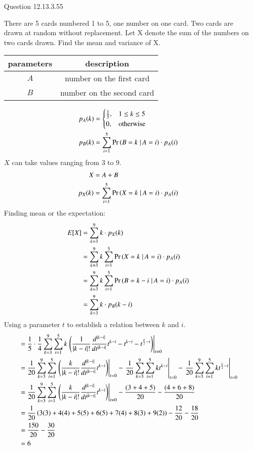 \documentclass[journal,12pt,onecolumn]{IEEEtran}
\theoremstyle{remark}
\begin{document}
Question 12.13.3.55

There are 5 cards numbered 1 to 5, one number on one card. Two cards are drawn at random without replacement. Let X denote the sum of the numbers on two cards drawn. Find the mean and variance of X.

\solution
\begin{table}[!ht]
\begin{tabular}{|c|c|}
	\hline
	\textbf{parameters} & \textbf{description}\\
	\hline
	$A$ & number on the first card \\
	\hline
	$B$ & number on the second card \\
	\hline
\end{tabular}
\end{table}
\begin{align}
p_A(k) &= 
	\begin{cases}
		\frac{1}{5}, & 1 \leq k \leq 5 \\
		0, & \text{otherwise}
	\end{cases}\\
p_B(k) &= \sum_{i=1}^5\Pr\left(B=k\left.\right |A=i\right)\cdot p_A(i)
\end{align}
$X$ can take values ranging from 3 to 9.
\begin{align}
	X &= A+B\\
	p_X(k) &= \sum_{i=1}^5\Pr\left(X=k\left. \right |A=i\right)\cdot p_A(i)
\end{align}
Finding mean or the expectation:
\begin{align}
	E[X] &= \sum_{k=3}^9k\cdot p_X(k)\\
	&= \sum_{k=3}^9k\sum_{i=1}^5\Pr\left(X=k\left. \right |A=i\right)\cdot p_A(i)\\
	&= \sum_{k=3}^9k\sum_{i=1}^5\Pr\left(B=k-i\left.\right |A=i\right)\cdot p_A(i)\\
	&= \sum_{k=3}^9k\cdot p_B(k-i)
\end{align}
Using a parameter $t$ to establish a relation between $k$ and $i$.
\begin{align}
	&= \frac{1}{5}\cdot\frac{1}{4}\sum_{k=3}^9\sum_{i=1}^5k\left.\left(\frac{1}{|k-i|!}\frac{d^{|k-i|}}{dt^{|k-i|}}t^{k-i}-t^{k-i}-t^{\frac{k}{2}-i}\right)\right |_{t=0}\\
	&= \frac{1}{20}\sum_{k=3}^9\sum_{i=1}^5\left.\left(\frac{k}{|k-i|!}\frac{d^{|k-i|}}{dt^{|k-i|}}t^{k-i}\right) \right |_{t=0} - \left.\frac{1}{20}\sum_{k=3}^9\sum_{i=1}^5kt^{k-i}\right |_{t=0} - \left.\frac{1}{20}\sum_{k=3}^9\sum_{i=1}^5kt^{\frac{k}{2}-i}\right |_{t=0}\\ \label{eq:12.13.3.55}
	&= \frac{1}{20}\sum_{k=3}^9\sum_{i=1}^5\left.\left(\frac{k}{|k-i|!}\frac{d^{|k-i|}}{dt^{|k-i|}}t^{k-i}\right) \right |_{t=0} - \frac{(3+4+5)}{20} - \frac{(4+6+8)}{20}\\
	&= \frac{1}{20}\left(3(3)+4(4)+5(5)+6(5)+7(4)+8(3)+9(2)\right) - \frac{12}{20} - \frac{18}{20}\\
	&= \frac{150}{20} - \frac{30}{20}\\
	&= 6
\end{align}
\end{document}
